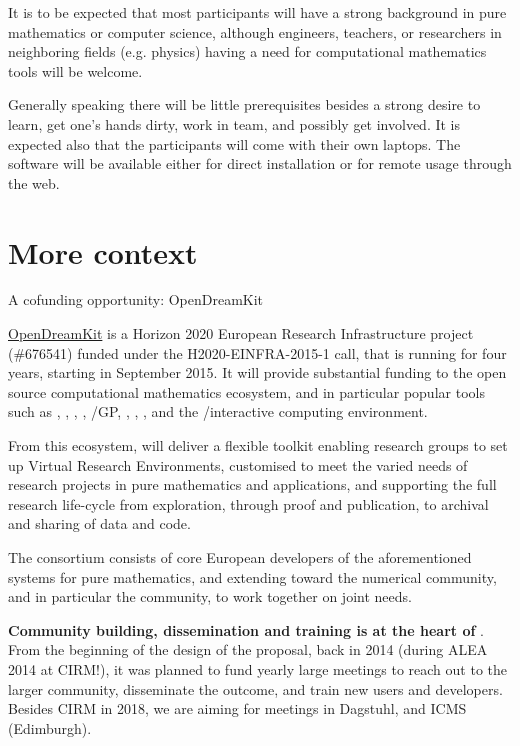 \documentclass[12pt]{amsart}
\makeatletter
\def\subsection{\@startsection{subsection}{2}%
  \z@{.3\linespacing\@plus.5\linespacing}{.1\linespacing}%
  {\normalfont\bfseries}}
\makeatother
\begin{document}
It is to be expected that most participants will have a strong
background in pure mathematics or computer science, although
engineers, teachers, or researchers in neighboring fields (e.g. physics)
having a need for computational mathematics tools will be
welcome.

Generally speaking there will be little prerequisites besides a strong
desire to learn, get one's hands dirty, work in team, and possibly get
involved. It is expected also that the participants will come with
their own laptops. The software will be available either for direct
installation or for remote usage through the web.

\section{More context}

\subsection{A cofunding opportunity: OpenDreamKit}

\href{http://opendreamkit.org}{OpenDreamKit} is a Horizon 2020
European Research Infrastructure project (\#676541) funded under the
H2020-EINFRA-2015-1 call, that is running for four years, starting in
September 2015. It will provide substantial funding to the open source
computational mathematics ecosystem, and in particular popular tools
such as \Linbox, \MPIR, \Sage, \GAP, \Pari/GP, \LMFDB, \Singular,
\MathHub, and the \IPython/\Jupyter interactive computing environment.

From this ecosystem, \ODK will deliver a flexible toolkit enabling
research groups to set up Virtual Research Environments, customised to
meet the varied needs of research projects in pure mathematics and
applications, and supporting the full research life-cycle from
exploration, through proof and publication, to archival and sharing of
data and code.

The \ODK  consortium consists of core European developers of the
aforementioned systems for pure mathematics, and extending toward the
numerical community, and in particular the \Jupyter  community, to work
together on joint needs.

\textbf{Community building, dissemination and training is at the heart of \ODK}. From the
beginning of the design of the proposal, back in 2014 (during ALEA
2014 at CIRM!), it was planned to fund yearly large meetings to reach
out to the larger community, disseminate the outcome, and train new
users and developers. Besides CIRM in 2018, we are aiming for meetings
in Dagstuhl, and ICMS (Edimburgh).
\end{document}
